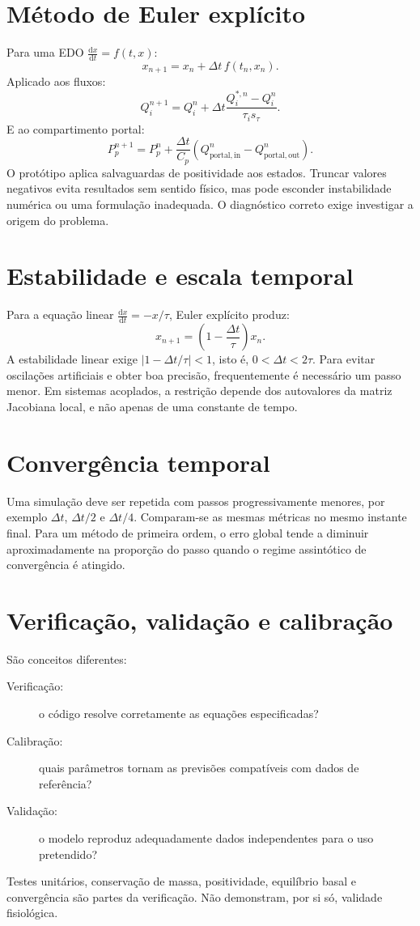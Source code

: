 \documentclass[11pt,a4paper,oneside]{book}
\newcommand{\diff}[2]{\frac{\mathrm{d}#1}{\mathrm{d}#2}}
\newcommand{\Qportin}{Q_{\mathrm{portal,in}}}
\newcommand{\Qportout}{Q_{\mathrm{portal,out}}}
\begin{document}
\section{Método de Euler explícito}
Para uma EDO $\diff{x}{t}=f(t,x)$:
\begin{equation}
  x_{n+1}=x_n+\Delta t\,f(t_n,x_n).
\end{equation}
Aplicado aos fluxos:
\begin{equation}
  Q_i^{n+1}=Q_i^n+\Delta t
  \frac{Q_i^{*,n}-Q_i^n}{\tau_i s_\tau}.
\end{equation}
E ao compartimento portal:
\begin{equation}
  P_p^{n+1}=P_p^n+\frac{\Delta t}{C_p}
  (\Qportin^n-\Qportout^n).
\end{equation}
O protótipo aplica salvaguardas de positividade aos estados. Truncar valores negativos evita resultados sem sentido físico, mas pode esconder instabilidade numérica ou uma formulação inadequada. O diagnóstico correto exige investigar a origem do problema.

\section{Estabilidade e escala temporal}
Para a equação linear $\diff{x}{t}=-x/\tau$, Euler explícito produz:
\[
x_{n+1}=\left(1-\frac{\Delta t}{\tau}\right)x_n.
\]
A estabilidade linear exige $|1-\Delta t/\tau|<1$, isto é, $0<\Delta t<2\tau$. Para evitar oscilações artificiais e obter boa precisão, frequentemente é necessário um passo menor. Em sistemas acoplados, a restrição depende dos autovalores da matriz Jacobiana local, e não apenas de uma constante de tempo.

\section{Convergência temporal}
Uma simulação deve ser repetida com passos progressivamente menores, por exemplo $\Delta t$, $\Delta t/2$ e $\Delta t/4$. Comparam-se as mesmas métricas no mesmo instante final. Para um método de primeira ordem, o erro global tende a diminuir aproximadamente na proporção do passo quando o regime assintótico de convergência é atingido.

\section{Verificação, validação e calibração}
São conceitos diferentes:
\begin{description}
  \item[Verificação:] o código resolve corretamente as equações especificadas?
  \item[Calibração:] quais parâmetros tornam as previsões compatíveis com dados de referência?
  \item[Validação:] o modelo reproduz adequadamente dados independentes para o uso pretendido?
\end{description}
Testes unitários, conservação de massa, positividade, equilíbrio basal e convergência são partes da verificação. Não demonstram, por si só, validade fisiológica.
\end{document}
